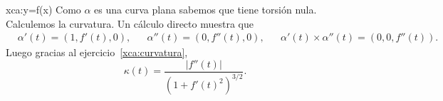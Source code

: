 \begin{sol}{xca:y=f(x)}
	Como $\alpha$ es una curva plana sabemos que tiene torsión nula. Calculemos
	la curvatura.  Un cálculo directo muestra que 
	\begin{align*}
	&\alpha'(t)=(1,f'(t),0), 
	&&\alpha''(t)=(0,f''(t),0),
	&&\alpha'(t)\times\alpha''(t)=(0,0,f''(t)).
	\end{align*}
	Luego gracias al ejercicio~\ref{xca:curvatura}, 
	\[
		\kappa(t)=\frac{|f''(t)|}{(1+f'(t)^2)^{3/2}}.
	\]
\end{sol}

